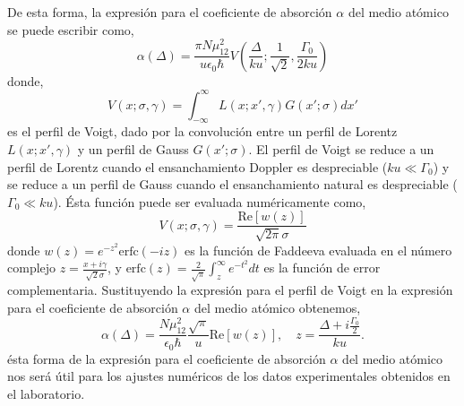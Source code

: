 De esta forma, la expresión para el coeficiente de absorción $\alpha$ del medio atómico se puede escribir como,
\begin{equation}
    \boxed{
        \alpha(\Delta) = \frac{\pi N \mu_{12}^2}{u \epsilon_0 \hbar} V\left(\frac{\Delta}{ku}; \frac{1}{\sqrt{2}}, \frac{\Gamma_0}{2ku}\right)
    }
\end{equation}
donde,
\begin{equation}
    V(x; \sigma, \gamma) = \int_{-\infty}^{\infty} L(x; x', \gamma) G(x'; \sigma) dx'
\end{equation} 
es el perfil de Voigt, dado por la convolución entre un perfil de Lorentz $L(x; x', \gamma)$ y un perfil de Gauss $G(x'; \sigma)$. El perfil de Voigt se reduce a un perfil de Lorentz cuando el ensanchamiento Doppler es despreciable ($ku \ll \Gamma_0$) y se reduce a un perfil de Gauss cuando el ensanchamiento natural es despreciable ($\Gamma_0 \ll ku$). Ésta función puede ser evaluada numéricamente como,
\begin{equation}
    V(x; \sigma, \gamma) = \frac{\text{Re}[w(z)]}{\sqrt{2 \pi} \sigma}
\end{equation}
donde $w(z) = e^{-z^2}\text{erfc}(-iz)$ es la función de Faddeeva evaluada en el número complejo $z = \frac{x + i \gamma}{\sqrt{2} \sigma}$, y $\text{erfc}(z) = \frac{2}{\sqrt{\pi}} \int_{z}^{\infty} e^{-t^2} dt$ es la función de error complementaria.
Sustituyendo la expresión para el perfil de Voigt en la expresión para el coeficiente de absorción $\alpha$ del medio atómico obtenemos,
\begin{equation}
    \boxed{
        \alpha(\Delta) = \frac{N \mu_{12}^2 }{\epsilon_0 \hbar} \frac{\sqrt{\pi}}{u} \text{Re}[w(z)] , \quad z = \frac{\Delta + i \frac{\Gamma_0}{2}}{ku}.
    }
\end{equation}
ésta forma de la expresión para el coeficiente de absorción $\alpha$ del medio atómico nos será útil para los ajustes numéricos de los datos experimentales obtenidos en el laboratorio.

